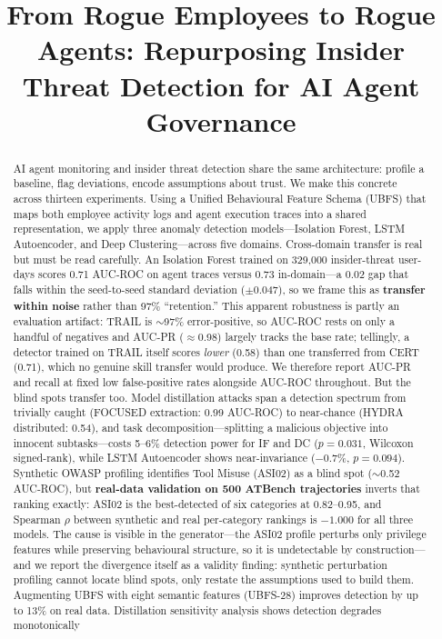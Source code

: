 \documentclass[conference]{IEEEtran}
\begin{document}
\title{From Rogue Employees to Rogue Agents: Repurposing Insider Threat Detection for AI Agent Governance}

\author{
}

\maketitle

\begin{abstract}
AI agent monitoring and insider threat detection share the same architecture: profile a baseline, flag deviations, encode assumptions about trust. We make this concrete across thirteen experiments. Using a Unified Behavioural Feature Schema (UBFS) that maps both employee activity logs and agent execution traces into a shared representation, we apply three anomaly detection models---Isolation Forest, LSTM Autoencoder, and Deep Clustering---across five domains. Cross-domain transfer is real but must be read carefully. An Isolation Forest trained on 329,000 insider-threat user-days scores 0.71 AUC-ROC on agent traces versus 0.73 in-domain---a 0.02 gap that falls within the seed-to-seed standard deviation ($\pm$0.047), so we frame this as \textbf{transfer within noise} rather than 97\% ``retention.'' This apparent robustness is partly an evaluation artifact: TRAIL is ${\sim}$97\% error-positive, so AUC-ROC rests on only a handful of negatives and AUC-PR ($\approx$0.98) largely tracks the base rate; tellingly, a detector trained on TRAIL itself scores \emph{lower} (0.58) than one transferred from CERT (0.71), which no genuine skill transfer would produce. We therefore report AUC-PR and recall at fixed low false-positive rates alongside AUC-ROC throughout. But the blind spots transfer too. Model distillation attacks span a detection spectrum from trivially caught (FOCUSED extraction: 0.99 AUC-ROC) to near-chance (HYDRA distributed: 0.54), and task decomposition---splitting a malicious objective into innocent subtasks---costs 5--6\% detection power for IF and DC ($p{=}0.031$, Wilcoxon signed-rank), while LSTM Autoencoder shows near-invariance ($-0.7\%$, $p{=}0.094$). Synthetic OWASP profiling identifies Tool Misuse (ASI02) as a blind spot (${\sim}$0.52 AUC-ROC), but \textbf{real-data validation on 500 ATBench trajectories} inverts that ranking exactly: ASI02 is the best-detected of six categories at 0.82--0.95, and Spearman $\rho$ between synthetic and real per-category rankings is $-1.000$ for all three models. The cause is visible in the generator---the ASI02 profile perturbs only privilege features while preserving behavioural structure, so it is undetectable by construction---and we report the divergence itself as a validity finding: synthetic perturbation profiling cannot locate blind spots, only restate the assumptions used to build them. Augmenting UBFS with eight semantic features (UBFS-28) improves detection by up to 13\% on real data. Distillation sensitivity analysis shows detection degrades monotonically 
\end{abstract}
\end{document}

